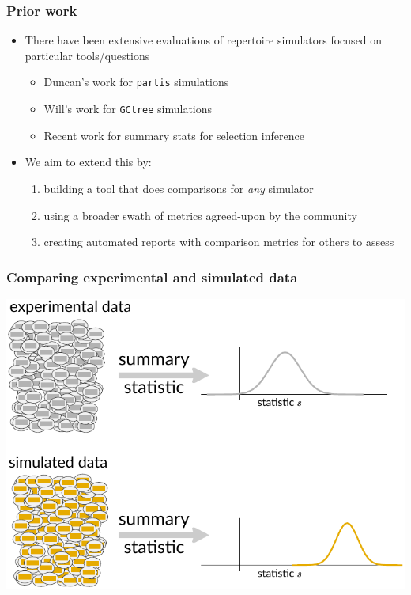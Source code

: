 \documentclass[mathserif,compress]{beamer}
\renewcommand\;{\,}
\begin{document}
\begin{frame}\frametitle{Prior work}
\begin{itemize}
\item
There have been extensive evaluations of repertoire simulators focused on particular tools/questions	
\medskip
\begin{itemize}
\item
 Duncan's work for \texttt{partis} simulations
 \bigskip
 \item
 Will's work for \texttt{GCtree} simulations
 \bigskip
 \item
 Recent work for summary stats for selection inference
  \end{itemize}
\bigskip
\item
We aim to extend this by:
\medskip
\begin{enumerate}
\item building a tool that does comparisons for \emph{any} simulator 
\bigskip
\item using a broader swath of metrics agreed-upon by the community
\bigskip
\item creating automated reports with comparison metrics for others to assess
\end{enumerate}
\end{itemize}
\end{frame}

\begin{frame}\frametitle{Comparing experimental and simulated data}
\begin{center}
\includegraphics[width=\linewidth]{Images/summary-stats.pdf}
\end{center}
\end{frame}
\end{document}
